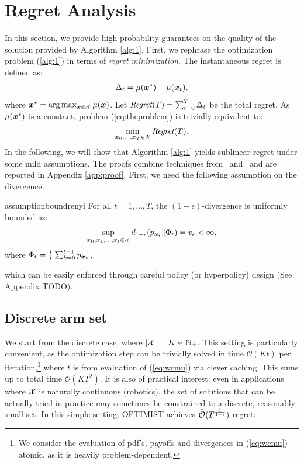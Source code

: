 \documentclass{article}
\makeatletter
\DeclareRobustCommand{\algoname}{OPTIMIST\@\xspace}
\makeatother
\begin{document}
\section{Regret Analysis}\label{sec:regret}
In this section, we provide high-probability guarantees on the quality of the solution provided by Algorithm \ref{alg:1}.
First, we rephrase the optimization problem (\ref{alg:1}) in terms of \textit{regret minimization}. The instantaneous regret is defined as:
\begin{align}\label{eq:inregret}
	\Delta_t = \mu(\boldsymbol{x}^*) - \mu(\boldsymbol{x}_t),
\end{align}
where $\boldsymbol{x}^* = \arg\max_{\boldsymbol{x}\in\mathcal{X}}\mu(\boldsymbol{x})$. Let $\textit{Regret}(T) = \sum_{t=0}^T\Delta_t$ be the total regret.
As $\mu(\boldsymbol{x}^*)$ is a constant, problem (\ref{eq:theproblem}) is trivially equivalent to:
\begin{align}\label{eq:regret}
	\min_{\boldsymbol{x}_0,\dots,\boldsymbol{x}_T\in\mathcal{X}} \textit{Regret}(T).
\end{align}
In the following, we will show that Algorithm \ref{alg:1} yields sublinear regret under some mild assumptions. The proofs combine techniques from~\citet{srinivas2010gaussian} and~\citet{bubeck2013bandits} and are reported in Appendix \ref{app:proof}.
First, we need the following assumption on the \Renyi divergence:
%
\begin{restatable}{assumption}{boundrenyi}\label{ass:boundrenyi}
	For all $t=1,\dots,T$, the $(1+\epsilon)$-\Renyi divergence is uniformly bounded as:
	\begin{align*}
		\sup_{\boldsymbol{x}_0,\boldsymbol{x}_1,\dots,\boldsymbol{x}_t\in\mathcal{X}}d_{1+\epsilon}(p_{\boldsymbol{x}_t}\|\Phi_t) = v_{\epsilon} < \infty,
	\end{align*}
	where $\Phi_t = \frac{1}{t}\sum_{k=0}^{t-1}p_{\boldsymbol{x}_k}$,
\end{restatable}
%
which can be easily enforced through careful policy (or hyperpolicy) design (See Appendix TODO).

\subsection{Discrete arm set}
We start from the discrete case, where $|\mathcal{X}| = K \in \mathbb{N}_{+}$.
This setting is particularly convenient, as the optimization step can be trivially solved in time $\mathcal{O}(Kt)$ per iteration,\footnote{We consider the evaluation of pdf's, payoffs and \Renyi divergences in (\ref{eq:wcmu}) atomic, as it is heavily problem-dependent.} where $t$ is from evaluation of (\ref{eq:wcmu}) via clever caching. This sums up to total time $\mathcal{O}(KT^2)$. It is also of practical interest: even in applications where $\mathcal{X}$ is naturally continuous (\eg robotics), the set of solutions that can be actually tried in practice may sometimes be constrained to a discrete, reasonably small set. In this simple setting, \algoname achieves $\widetilde{\mathcal{O}}(T^{\frac{1}{1+\epsilon}})$ regret:
\end{document}
